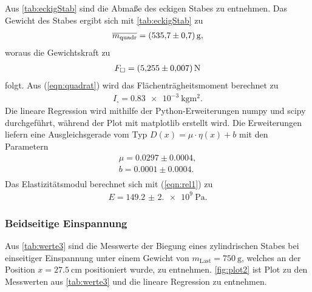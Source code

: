 \sloppy
Aus \autoref{tab:eckigStab} sind die Abmaße des eckigen Stabes zu entnehmen. Das Gewicht des Stabes ergibt sich mit \autoref{tab:eckigStab} zu 
\begin{align*}
  \overline{m_{\text{quadr}}} = \SI{535,7 (0,7)}{\gram},
\end{align*}
woraus die Gewichtskraft zu 
\begin{align*}
  F_{\square} = \SI{5.255 (0.007)}{\newton}
\end{align*} 
folgt. Aus (\ref{eqn:quadrat}) wird das Flächenträgheitsmoment berechnet zu
\begin{align*}
  I_{\square} = \SI{0.83e-3}{\kilo\gram\meter^2}.
\end{align*}
Die lineare Regression wird mithilfe der Python-Erweiterungen numpy \cite{numpy} und scipy \cite{scipy} durchgeführt, während
der Plot mit matplotlib \cite{matplotlib} erstellt wird. Die Erweiterungen liefern eine Ausgleichsgerade vom Typ $D(x) = \mu\cdot\eta(x)+b$
mit den Parametern
\begin{align*}
  \mu = 0.0297 \pm 0.0004, \\
  b = 0.0001 \pm 0.0004. \\
\end{align*}
Das Elastizitätsmodul berechnet sich mit (\ref{eqn:rel1}) zu
\begin{align*}
  E = \SI{149.2(2.0)e9}{\Pa}.
\end{align*}

\subsubsection{Beidseitige Einspannung}
\label{subsubsec:beidsEck}
Aus \autoref{tab:werte3} sind die Messwerte der Biegung eines zylindrischen Stabes bei einseitiger Einspannung unter einem Gewicht von
$m_{\text{Last}} = \SI{750}{\gram}$, welches an der Position $x= \SI{27.5}{\cm}$ positioniert wurde, zu entnehmen.
\autoref{fig:plot2} ist Plot zu den Messwerten aus \autoref{tab:werte3} und die lineare Regression zu entnehmen.



